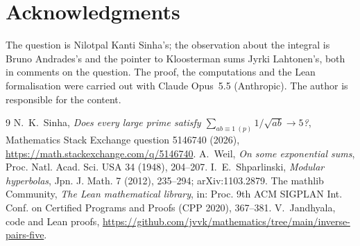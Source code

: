 \documentclass[11pt]{amsart}
\theoremstyle{remark}
\begin{document}
\section*{Acknowledgments}

The question is Nilotpal Kanti Sinha's; the observation about the integral is Bruno Andrades's and the pointer to Kloosterman sums Jyrki Lahtonen's, both in comments on the question. The proof, the computations and the Lean formalisation were carried out with Claude Opus~5.5 (Anthropic). The author is responsible for the content.

\begin{thebibliography}{9}
 N.~K.~Sinha, \emph{Does every large prime satisfy $\sum_{ab\equiv1\ (p)}1/\sqrt{ab}\to5$?}, Mathematics Stack Exchange question 5146740 (2026), \url{https://math.stackexchange.com/q/5146740}.
 A.~Weil, \emph{On some exponential sums}, Proc. Natl. Acad. Sci. USA 34 (1948), 204--207.
 I.~E.~Shparlinski, \emph{Modular hyperbolas}, Jpn. J. Math. 7 (2012), 235--294; arXiv:1103.2879.
 The mathlib Community, \emph{The Lean mathematical library}, in: Proc. 9th ACM SIGPLAN Int. Conf. on Certified Programs and Proofs (CPP 2020), 367--381.
 V.~Jandhyala, code and Lean proofs, \url{https://github.com/jvvk/mathematics/tree/main/inverse-pairs-five}.
\end{thebibliography}
\end{document}
